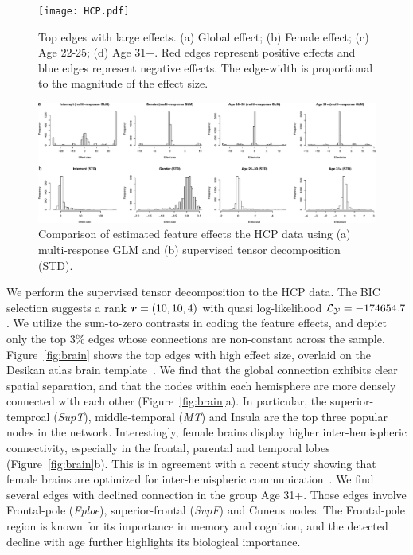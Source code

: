 \documentclass[12pt]{article}
\theoremstyle{definition}
\theoremstyle{definition}
\begin{document}
\begin{figure}[!h]
\centering
\texttt{[image: HCP.pdf]}
\caption{Top edges with large effects. (a) Global effect; (b) Female effect; (c) Age 22-25; (d) Age 31+. Red edges represent positive effects and blue edges represent negative effects. The edge-width is proportional to the magnitude of the effect size.
}\label{fig:brain}
\vspace{1cm}
\includegraphics[width=16cm]{compare_HCP.pdf}
\caption{Comparison of estimated feature effects the HCP data using (a) multi-response GLM and (b) supervised tensor decomposition (STD). }\label{fig:s1}
\vspace{-.1cm}
\end{figure}


We perform the supervised tensor decomposition to the HCP data. %
The BIC selection suggests a rank $\bm{r}=(10,10,4)$ with quasi log-likelihood $\mathcal{L}_{\mathcal{Y}}=-174654.7$. We utilize the sum-to-zero contrasts in coding the feature effects, and depict only the top 3\% edges whose connections are non-constant across the sample. Figure~\ref{fig:brain} shows the top edges with high effect size, overlaid on the Desikan atlas brain template~\citep{desikan2006automated}. We find that the global connection exhibits clear spatial separation, and that the nodes within each hemisphere are more densely connected with each other (Figure~\ref{fig:brain}a). In particular, the superior-temproal (\emph{SupT}), middle-temporal (\emph{MT}) and Insula are the top three popular nodes in the network. Interestingly, female brains display higher inter-hemispheric connectivity, especially in the frontal, parental and temporal lobes (Figure~\ref{fig:brain}b). This is in agreement with a recent study showing that female brains are optimized for inter-hemispheric communication~\citep{ingalhalikar2014sex}. We find several edges with declined connection in the group Age 31+. Those edges involve Frontal-pole (\emph{Fploe}), superior-frontal (\emph{SupF}) and Cuneus nodes. The Frontal-pole region is known for its importance in memory and cognition, and the detected decline with age further highlights its biological importance. 
\end{document}
